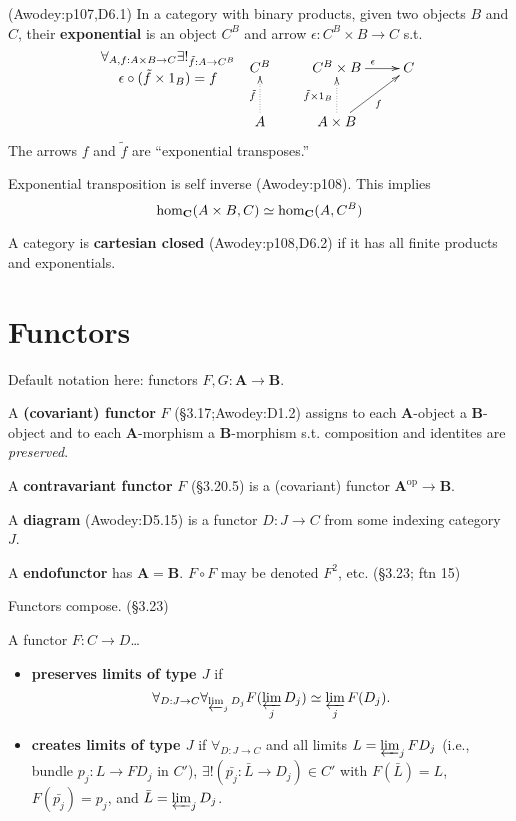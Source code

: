 \documentclass[10pt,twocolumn,letterpaper]{article}
\newcommand{\defn}[1]{{\bf #1}}
\begin{document}
  (Awodey:p107,D6.1) In a category with binary products, given two objects $B$ and $C$,
  their \defn{exponential} is an object $C^B$ and arrow $\epsilon : C^B \times B \to C$
  s.t.
     \[\xymatrix{
     {}\save[]+<-1cm,0cm>*\txt<8pc>{$\forall_{A,f : A \times B \to C}\exists!_{\tilde f : A \to C^B}$\\
                                    $\epsilon \circ (\tilde f \times 1_B) = f$}\restore
     & C^B & C^B \times B \ar[r]^\epsilon & C \\
     & A \ar@{..>}[u]^{\tilde f} & A \times B \ar@{..>}[u]^{\tilde f \times 1_B} \ar[ur]_f
     }\]
  The arrows $f$ and $\tilde f$ are ``exponential transposes.''

  Exponential transposition is self inverse (Awodey:p108).  This implies
    \[ \mbox{hom}_{\bf C}(A \times B, C) \simeq \mbox{hom}_{\bf C}(A, C^B) \]

  A category is \defn{cartesian closed} (Awodey:p108,D6.2) if it has all
  finite products and exponentials.

\section{Functors}

  Default notation here: functors $F,G : \mathbf{A} \to \mathbf{B}$.

  A \defn{(covariant) functor} $F$ (\S3.17;Awodey:D1.2) assigns to each
  $\mathbf{A}$-object a $\mathbf{B}$-object and to each
  $\mathbf{A}$-morphism a $\mathbf{B}$-morphism s.t. composition and
  identites are {\em preserved}.

  A \defn{contravariant functor} $F$ (\S3.20.5) is a (covariant) functor
  $\mathbf{A}^\text{op} \to \mathbf{B}$.

  A \defn{diagram} (Awodey:D5.15) is a functor $D : J \to C$ from some
  indexing category $J$.

  A \defn{endofunctor} has $\mathbf{A} = \mathbf{B}$.  $F \circ F$ may be
  denoted $F^2$, etc. (\S3.23; ftn 15)

  Functors compose. (\S3.23)

  A functor $F : C \to D$\dots
  \begin{itemize}
    \item \defn{preserves limits of type $J$} if
      \[ \forall_{D : J \to C}\forall_{\varprojlim_j D_j} F(\varprojlim_j D_j) \simeq \varprojlim_j F(D_j).\]

    \item \defn{creates limits of type $J$} if $\forall_{D : J \to C}$
      and all limits $L = \varprojlim_j FD_j$ (i.e., bundle $p_j : L \to FD_j$ in $C'$),
      $\exists! (\bar{p_j} : \bar{L} \to D_j) \in C'$ with $F(\bar L) = L$, $F(\bar{p_j}) = p_j$,
      and $\bar L = \varprojlim_j D_j$. 
  \end{itemize}
\end{document}
